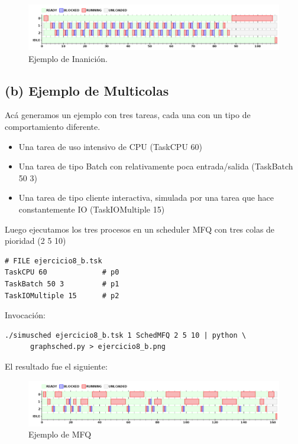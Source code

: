 \begin{figure}[H]
  \centering
    \includegraphics[width=1\textwidth]{img/ejercicio8_a.png}
    \caption{Ejemplo de Inanici\'on.}
\end{figure}

\subsection{(b) Ejemplo de Multicolas}

Ac\'a generamos un ejemplo con tres tareas, cada una con un tipo de comportamiento diferente.

\begin{itemize}
 \item Una tarea de uso intensivo de CPU (TaskCPU 60)
 \item Una tarea de tipo Batch con relativamente poca entrada/salida (TaskBatch 50 3)
 \item Una tarea de tipo cliente interactiva, simulada por una tarea que hace constantemente IO (TaskIOMultiple 15)
\end{itemize}

Luego ejecutamos los tres procesos en un scheduler MFQ con tres colas de pioridad (2 5 10)

\begin{framed}
\begin{verbatim}
# FILE ejercicio8_b.tsk
TaskCPU 60             # p0
TaskBatch 50 3         # p1
TaskIOMultiple 15      # p2
\end{verbatim}
\end{framed}

Invocaci\'on:

\begin{framed}
\begin{verbatim}
./simusched ejercicio8_b.tsk 1 SchedMFQ 2 5 10 | python \
      graphsched.py > ejercicio8_b.png
\end{verbatim}
\end{framed}

El resultado fue el siguiente:

\begin{figure}[H]
  \centering
    \includegraphics[width=1\textwidth]{img/ejercicio8_b.png}
    \caption{Ejemplo de MFQ}
\end{figure}

